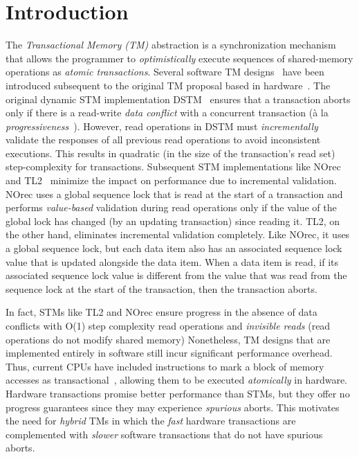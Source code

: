 \section{Introduction}
\label{sec:intro}
%
%
The \emph{Transactional Memory (TM)} abstraction is a synchronization mechanism 
that allows the programmer to \emph{optimistically} execute sequences of shared-memory
operations as \emph{atomic transactions}.
Several software TM designs~\cite{norec, ST95,HLM+03, astm, fraser} have been introduced subsequent to the original TM proposal based in
hardware~\cite{HM93}. 
The original dynamic STM implementation DSTM~\cite{HLM+03} ensures that a transaction aborts only if there is a read-write \emph{data conflict} with a concurrent
transaction (\`a la \emph{progressiveness}~\cite{tm-book}). However, read operations in DSTM must \emph{incrementally} validate
the responses of all previous read operations to avoid inconsistent executions. 
This results in quadratic  (in the size of the transaction's read
set) step-complexity for transactions. Subsequent STM 
implementations like NOrec~\cite{norec} and TL2~\cite{DSS06}
minimize the impact on performance due to incremental validation.
NOrec uses a global sequence lock that is read at the start of a transaction and performs \emph{value-based}
validation during read operations only if the value of the global lock has changed (by an updating transaction) 
since reading it.
TL2, on the other hand, eliminates incremental validation completely.
Like NOrec, it uses a global sequence lock, but each data item also 
has an associated sequence lock value that is updated alongside the data item.
When a data item is read, if its associated sequence lock value is different 
from the value that was read from the sequence lock at the start of the transaction, then the transaction aborts.

In fact, STMs like TL2 and NOrec ensure progress in the absence of data conflicts with 
O(1) step complexity read operations and \emph{invisible reads} (read operations 
do not modify shared memory) 
Nonetheless, TM designs that are implemented entirely in software still incur significant performance overhead.
Thus, current CPUs have included instructions to mark a block of memory accesses as transactional~\cite{Rei12, asf, bluegene}, allowing them to be executed \emph{atomically} in hardware.
Hardware transactions promise better performance than STMs, but they offer no progress guarantees 
since they may experience \emph{spurious} aborts. This motivates the need for
\emph{hybrid} TMs in which the \emph{fast} hardware transactions are 
complemented with \emph{slower} software transactions that do not have spurious aborts.

